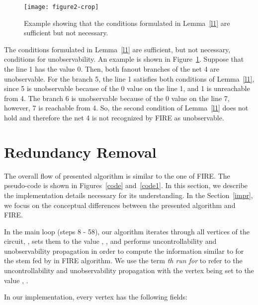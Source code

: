 \documentclass[conference]{IEEEtran} \usepackage{times}
\begin{document}
\begin{figure}[t!]
\begin{center}
\texttt{[image: figure2-crop]}
\caption{Example showing that the conditions formulated in 
Lemma~\ref{l1} are sufficient but not necessary.} \label{f2}
\end{center}
\end{figure}

The conditions formulated in Lemma~\ref{l1} are sufficient, but not
necessary, conditions for unobservability. 
An example is shown in Figure~\ref{f2}.  Suppose that the
line 1 has the value 0. Then, both fanout branches of the net 4 are
unobservable. For the branch 5, the line 1 satisfies both conditions
of Lemma~\ref{l1}, since 5 is unobservable because of the 0 value on
the line 1, and 1 is unreachable from 4. The branch 6 is unobservable
because of the 0 value on the line 7, however, 7 is reachable from 4.
So, the second condition of Lemma~\ref{l1} does not hold and therefore
the net 4 is not recognized by FIRE as unobservable.

\section{Redundancy Removal}
\label{alg}

The overall flow of presented algorithm is similar to the one of FIRE.
The pseudo-code is shown in Figures~\ref{code}
and~\ref{code1}. In this section, we describe the implementation
details necessary for its understanding. In the Section~\ref{impr}, we
focus on the conceptual differences between the presented algorithm and FIRE.

In the main loop (steps 8 - 58), our algorithm iterates through all
vertices of the circuit, , sets them to the value ,
, and performs uncontrollability and unobservability
propagation in order to compute the information similar to  for
the stem fed by  in FIRE algorithm.  We use the term {\em
th run for}  to refer to the uncontrollability and
unobservability propagation with the vertex  being set to
the value , .

In our implementation, every vertex  has the following
fields:
\end{document}
